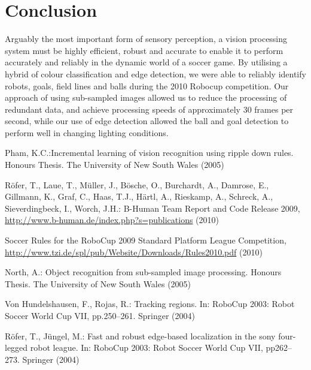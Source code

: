 \documentclass[runningheads,a4paper]{llncs}
\begin{document}
\section{Conclusion}

Arguably the most important form of sensory perception, a vision processing system must be highly
efficient, robust and accurate to enable it to perform accurately and reliably in the dynamic world
of a soccer game. By utilising a hybrid of colour classification and edge detection, we were able
to reliably identify robots, goals, field lines and balls during the 2010 Robocup competition. Our
approach of using sub-sampled images allowed us to reduce the processing of redundant data, and
achieve processing speeds of approximately 30 frames per second, while our use of edge detection
allowed the ball and goal detection to perform well in changing lighting conditions.

\begin{thebibliography}{4}

 Pham, K.C.:Incremental learning of vision recognition using ripple down rules.
Honours Thesis. The University of New South Wales (2005)

 R{\"o}fer, T., Laue, T., M{\"u}ller, J., B{\"o}sche, O., Burchardt, A., Damrose, E., Gillmann, K., Graf, C., Haas, T.J., H{\"a}rtl, A., Rieskamp, A., Schreck, A., Sieverdingbeck, I., Worch, J.H.:
B-Human Team Report and Code Release 2009, \url{http://www.b-human.de/index.php?s=publications} (2010)

 Soccer Rules for the RoboCup 2009 Standard Platform League Competition, \url{http://www.tzi.de/spl/pub/Website/Downloads/Rules2010.pdf} (2010)

 North, A.: Object recognition from sub-sampled image processing.
Honours Thesis. The University of New South Wales (2005)

 Von Hundelshausen, F., Rojas, R.: Tracking regions. In:
RoboCup 2003: Robot Soccer World Cup VII, pp.250--261. Springer (2004)

 R\"{o}fer, T., J\"{u}ngel, M.: Fast and robust edge-based localization in the sony four-legged robot league. In: RoboCup 2003: Robot Soccer World Cup VII, pp262--273. Springer (2004)

\end{thebibliography}
\end{document}
